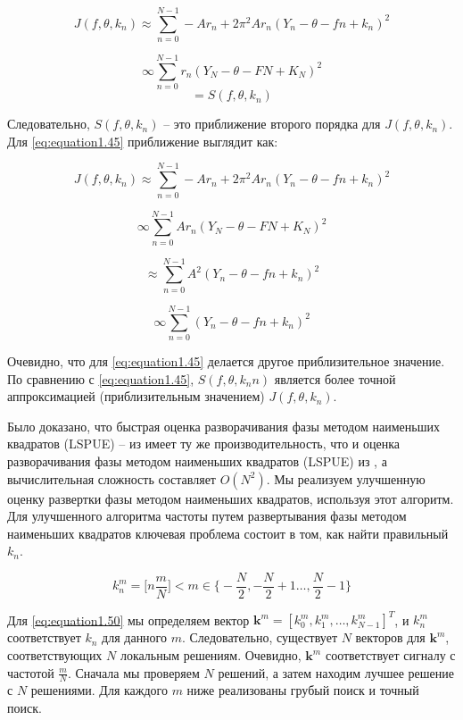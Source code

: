 $$
J(f, \theta, k_n) \approx \sum_{n=0}^{N-1} -Ar_n+2\pi^2Ar_n(Y_n-\theta-fn+k_n)^2
$$

\begin{equation}
	\label{eq:equation1.48}	
	\infty \sum_{n=0}^{N-1} r_n (Y_N-\theta-FN+K_N)^2
\end{equation}
$$
=S(f,\theta,k_n)
$$

Следовательно, $S (f, \theta, k_n)$ -- это приближение второго порядка для $J (f, \theta, k_n)$. Для \ref{eq:equation1.45} приближение выглядит как:

$$
J(f, \theta, k_n) \approx \sum_{n=0}^{N-1} -Ar_n+2\pi^2Ar_n(Y_n-\theta-fn+k_n)^2
$$

$$
\infty \sum_{n=0}^{N-1} Ar_n (Y_N-\theta-FN+K_N)^2
$$

\begin{equation}
	\label{eq:equation1.49}	
	\approx \sum_{n=0}^{N-1} A^2(Y_n-\theta-fn+k_n)^2
\end{equation}

$$
\infty \sum_{n=0}^{N-1} (Y_n-\theta-fn+k_n)^2
$$

Очевидно, что для \ref{eq:equation1.45} делается другое приблизительное значение. По сравнению с \ref{eq:equation1.45}, $S (f, \theta, k_nn)$ является более точной аппроксимацией (приблизительным значением) $J (f, \theta, k_n)$.

Было доказано, что быстрая оценка разворачивания фазы методом наименьших квадратов (LSPUE) -- из \cite{7456233} имеет ту же производительность, что и оценка разворачивания фазы методом наименьших квадратов (LSPUE) из \cite{mckilliam2010frequency}, а вычислительная сложность составляет $O(N^2)$. Мы реализуем улучшенную оценку развертки фазы методом наименьших квадратов, используя этот алгоритм. 
Для улучшенного алгоритма частоты путем развертывания фазы методом наименьших квадратов ключевая проблема состоит в том, как найти правильный $k_n$.

\begin{equation}
	\label{eq:equation1.50}	
	k_{n}^{m} = \biggl[n \frac{m}{N}\biggl] < m \in \biggl\{-\frac{N}{2}, -\frac{N}{2}+1 \ldots , \frac{N}{2}-1 \biggl\}
\end{equation}

Для \ref{eq:equation1.50} мы определяем вектор $\textbf{k}^m = [k^m_0, k^m_1, \ldots, k^m_{N- 1}]^T$, и $k^m_n$ соответствует $k_n$ для данного $m$. Следовательно, существует $N$ векторов для $\textbf{k}^m$, соответствующих $N$ локальным решениям. Очевидно, $\textbf{k}^m$ соответствует сигналу с частотой $\frac{m}{N}$. Сначала мы проверяем $N$ решений, а затем находим лучшее решение с $N$ решениями. Для каждого $m$ ниже реализованы грубый поиск и точный поиск.

